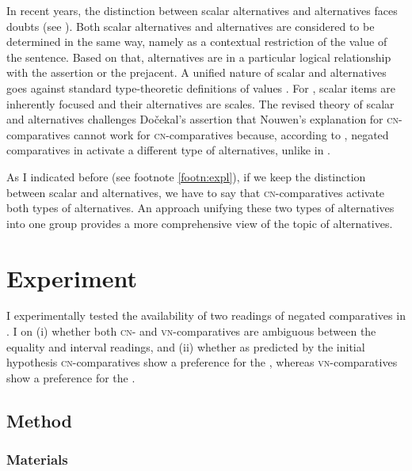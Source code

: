 \documentclass[output=paper, colorlinks, citecolor=brown, newtxmath]{langsci/langscibook}
\begin{document}
In recent years, the distinction between scalar alternatives and  alternatives faces doubts (see \citealt{katzir2007structurally,fox2011characterization,fox2018economy}). Both scalar alternatives and  alternatives are considered to be determined in the same way, namely as a contextual restriction of the  value of the sentence. Based on that, alternatives are in a particular logical relationship with the assertion or the prejacent. A unified nature of scalar and  alternatives goes against standard type-theoretic definitions of  values \citep{fox2011characterization}. For \citet{krifka1995semantics}, scalar items are inherently focused and their alternatives are scales. The revised theory of scalar and  alternatives challenges Dočekal's assertion that Nouwen's explanation for  \textsc{cn-}comparatives cannot work for  \textsc{cn-}comparatives because, according to \citet{dovcekal2017upper}, negated comparatives in  activate a different type of alternatives, unlike in .

As I indicated before (see footnote \ref{footn:expl}), if we keep the distinction between scalar and  alternatives, we have to say that  \textsc{cn-}comparatives activate both types of alternatives. An approach unifying these two types of alternatives into one group provides a more comprehensive view of the topic of alternatives.


\section{Experiment}

I experimentally tested the availability of two readings of negated comparatives in . I  on (i) whether both \textsc{cn-} and \textsc{vn-}comparatives are ambiguous between the equality and interval readings, and (ii) whether as predicted by the initial hypothesis \textsc{cn-}comparatives show a preference for the , whereas \textsc{vn-}comparatives show a preference for the .

\subsection{Method}

\subsubsection{Materials}
\end{document}
